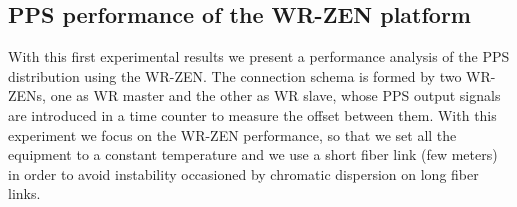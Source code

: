 \subsection{PPS performance of the WR-ZEN platform}
\label{subsec: charact_zen}

With this first experimental results we present a performance analysis of the 
PPS distribution using the WR-ZEN. The connection schema is formed by two 
WR-ZENs, one as WR master and the other as WR slave, whose PPS output signals 
are introduced in a time counter to measure the offset between them. With this 
experiment we focus on the WR-ZEN performance, so that we set all the equipment 
to a constant temperature and we use a short fiber link (few meters) in order 
to avoid instability occasioned by chromatic dispersion on long fiber links.

